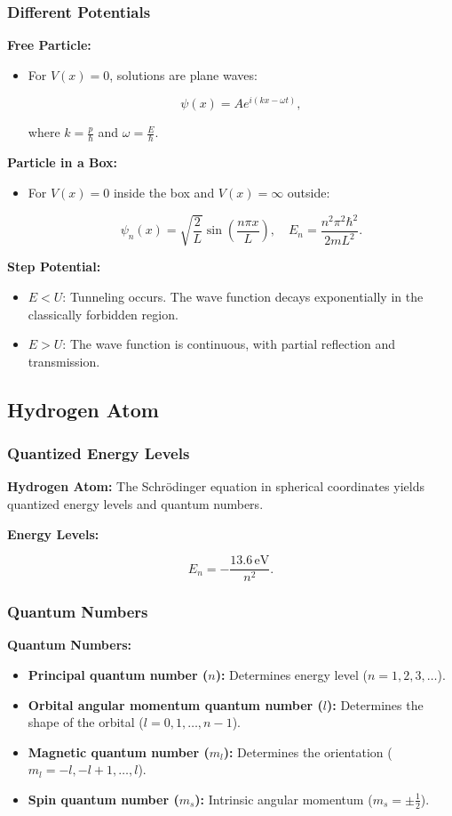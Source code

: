 \documentclass{article}
\newcommand{\eqbox}[1]{\begin{tcolorbox}[colback=gray!10] #1 \end{tcolorbox}}
\newcommand{\conceptbox}[1]{\begin{tcolorbox}[colback=blue!10] #1 \end{tcolorbox}}
\begin{document}
\subsubsection{Different Potentials}
\conceptbox{
\textbf{Free Particle:}
\begin{itemize}
    \item For \( V(x) = 0 \), solutions are plane waves:
    \eqbox{
    \[
    \psi(x) = Ae^{i(kx - \omega t)},
    \]}
    where \( k = \frac{p}{\hbar} \) and \( \omega = \frac{E}{\hbar} \).
\end{itemize}
}

\conceptbox{
\textbf{Particle in a Box:}
\begin{itemize}
    \item For \( V(x) = 0 \) inside the box and \( V(x) = \infty \) outside:
    \eqbox{
    \[
    \psi_n(x) = \sqrt{\frac{2}{L}} \sin\left(\frac{n\pi x}{L}\right), \quad E_n = \frac{n^2\pi^2\hbar^2}{2mL^2}.
    \]}
\end{itemize}
}

\conceptbox{
\textbf{Step Potential:}
\begin{itemize}
    \item \( E < U \): Tunneling occurs. The wave function decays exponentially in the classically forbidden region.
    \item \( E > U \): The wave function is continuous, with partial reflection and transmission.
\end{itemize}
}

\subsection{Hydrogen Atom}

\subsubsection{Quantized Energy Levels}
\conceptbox{
\textbf{Hydrogen Atom:}
The Schrödinger equation in spherical coordinates yields quantized energy levels and quantum numbers.

\textbf{Energy Levels:}
\eqbox{
\[
E_n = -\frac{13.6 \, \text{eV}}{n^2}.
\]}
}

\subsubsection{Quantum Numbers}
\conceptbox{
\textbf{Quantum Numbers:}
\begin{itemize}
    \item \textbf{Principal quantum number (\( n \)):} Determines energy level (\( n = 1, 2, 3, \dots \)).
    \item \textbf{Orbital angular momentum quantum number (\( l \)):} Determines the shape of the orbital (\( l = 0, 1, \dots, n-1 \)).
    \item \textbf{Magnetic quantum number (\( m_l \)):} Determines the orientation (\( m_l = -l, -l+1, \dots, l \)).
    \item \textbf{Spin quantum number (\( m_s \)):} Intrinsic angular momentum (\( m_s = \pm \frac{1}{2} \)).
\end{itemize}
}
\end{document}
